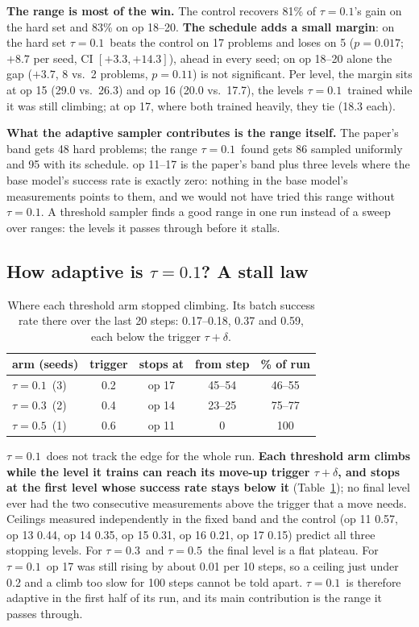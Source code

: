 \documentclass[11pt]{article}
\newcommand{\tauone}{$\tau{=}0.1$}
\newcommand{\tauthree}{$\tau{=}0.3$}
\newcommand{\taufive}{$\tau{=}0.5$}
\begin{document}
\textbf{The range is most of the win.} The control recovers 81\% of \tauone's gain on the hard set and 83\%
on op 18--20. \textbf{The schedule adds a small margin}: on the hard set \tauone\ beats the control on 17
problems and loses on 5 ($p=0.017$; $+8.7$ per seed, CI $[+3.3,+14.3]$), ahead in every seed; on op 18--20
alone the gap ($+3.7$, 8 vs.\ 2 problems, $p=0.11$) is not significant. Per level, the margin sits at op 15
(29.0 vs.\ 26.3) and op 16 (20.0 vs.\ 17.7), the levels \tauone\ trained while it was still climbing;
at op 17, where both trained heavily, they tie (18.3 each).

\textbf{What the adaptive sampler contributes is the range itself.} The paper's band gets 48 hard problems;
the range \tauone\ found gets 86 sampled uniformly and 95 with its schedule. op 11--17 is the paper's band
plus three levels where the base model's success rate is exactly zero: nothing in the base model's
measurements points to them, and we would not have tried this range without \tauone. A threshold sampler
finds a good range in one run instead of a sweep over ranges: the levels it passes through before it stalls.

\subsection{How adaptive is \texorpdfstring{\tauone}{tau=0.1}? A stall law}
\label{sec:stall}

\begin{table}[t]
\centering
\small
\begin{tabular}{lcccc}
\toprule
arm (seeds) & trigger & stops at & from step & \% of run \\
\midrule
\tauone\ (3)   & 0.2 & op 17 & 45--54 & 46--55 \\
\tauthree\ (2) & 0.4 & op 14 & 23--25 & 75--77 \\
\taufive\ (1)   & 0.6 & op 11 & 0      & 100 \\
\bottomrule
\end{tabular}
\caption{Where each threshold arm stopped climbing. Its batch success rate there over the last 20 steps:
0.17--0.18, 0.37 and 0.59, each below the trigger $\tau+\delta$.}
\label{tab:stall}
\end{table}

\tauone\ does not track the edge for the whole run. \textbf{Each threshold arm climbs while the level it
trains can reach its move-up trigger $\tau+\delta$, and stops at the first level whose success rate stays
below it} (Table~\ref{tab:stall}); no final level ever had the two consecutive measurements above the trigger
that a move needs. Ceilings measured independently in the fixed band and the control (op 11 0.57, op 13
0.44, op 14 0.35, op 15 0.31, op 16 0.21, op 17 0.15) predict all three stopping levels. For \tauthree\ and
\taufive\ the final level is a flat plateau. For \tauone\ op 17 was still rising by about 0.01 per 10 steps,
so a ceiling just under 0.2 and a climb too slow for 100 steps cannot be told apart. \tauone\ is therefore
adaptive in the first half of its run, and its main contribution is the range it passes through.
\end{document}
